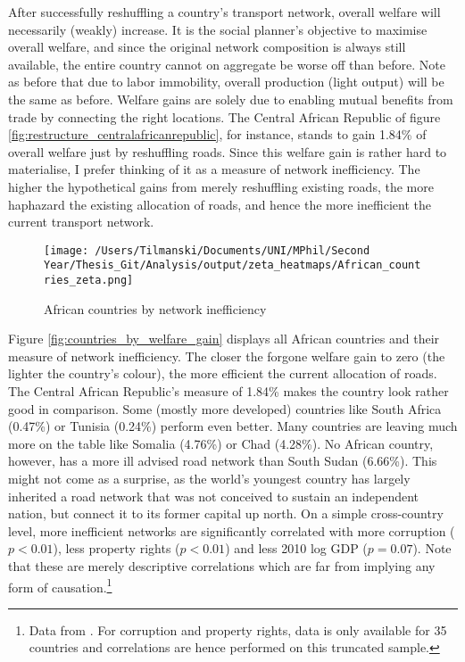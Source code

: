 \documentclass[11pt, oneside]{article}   	%
\begin{document}
After successfully reshuffling a country's transport network, overall welfare will necessarily (weakly) increase. It is the social planner's objective to maximise overall welfare, and since the original network composition is always still available, the entire country cannot on aggregate be worse off than before. Note as before that due to labor immobility, overall production (light output) will be the same as before. Welfare gains are solely due to enabling mutual benefits from trade by connecting the right locations. The Central African Republic of figure \eqref{fig:restructure_centralafricanrepublic}, for instance, stands to gain 1.84\% of overall welfare just by reshuffling roads. Since this welfare gain is rather hard to materialise, I prefer thinking of it as a measure of network inefficiency. The higher the hypothetical gains from merely reshuffling existing roads, the more haphazard the existing allocation of roads, and hence the more inefficient the current transport network.

\begin{figure}
\centering
\caption{African countries by network inefficiency}
\texttt{[image: /Users/Tilmanski/Documents/UNI/MPhil/Second Year/Thesis\_Git/Analysis/output/zeta\_heatmaps/African\_countries\_zeta.png]}

\label{fig:countries_by_welfare_gain}
\end{figure}

Figure \eqref{fig:countries_by_welfare_gain} displays all African countries and their measure of network inefficiency. The closer the forgone welfare gain to zero (the lighter the country's colour), the more efficient the current allocation of roads. The Central African Republic's measure of 1.84\% makes the country look rather good in comparison. Some (mostly more developed) countries like South Africa (0.47\%) or Tunisia (0.24\%) perform even better. Many countries are leaving much more on the table like Somalia (4.76\%) or Chad (4.28\%). No African country, however, has a more ill advised road network than South Sudan (6.66\%). This might not come as a surprise, as the world's youngest country has largely inherited a road network that was not conceived to sustain an independent nation, but connect it to its former capital up north. On a simple cross-country level, more inefficient networks are significantly correlated with more corruption ($p < 0.01$), less property rights ($p < 0.01$) and less 2010 log GDP ($p=0.07$). Note that these are merely descriptive correlations which are far from implying any form of causation.\footnote{Data from \cite{the_world_bank_world_2017}. For corruption and property rights, data is only available for 35 countries and correlations are hence performed on this truncated sample.}
\end{document}
